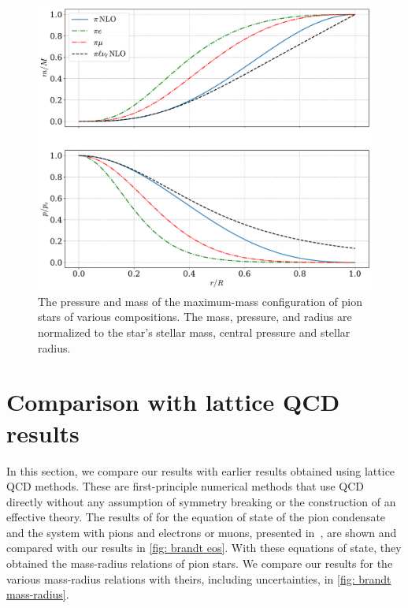 \begin{figure}[p]
    \centering
    \includegraphics[width=.85\textwidth]{../scripts/figurer/pion_star/max_pressure_mass.pdf}
    \caption{
        The pressure and mass of the maximum-mass configuration of pion stars of various compositions.
        The mass, pressure, and radius are normalized to the star's stellar mass, central pressure and stellar radius.
        }
        \label{fig: max pressure and mass}
\end{figure}






\section{Comparison with lattice QCD results}


In this section, we compare our results with earlier results obtained using lattice QCD methods.
These are first-principle numerical methods that use QCD directly without any assumption of symmetry breaking or the construction of an effective theory.
The results of \citeauthor{brandtNewClassCompact2018} for the equation of state of the pion condensate and the system with pions and electrons or muons, presented in~\autocite{brandtNewClassCompact2018}, are shown and compared with our results in \autoref{fig: brandt eos}.
With these equations of state, they obtained the mass-radius relations of pion stars.
We compare our results for the various mass-radius relations with theirs, including uncertainties, in \autoref{fig: brandt mass-radius}. 


